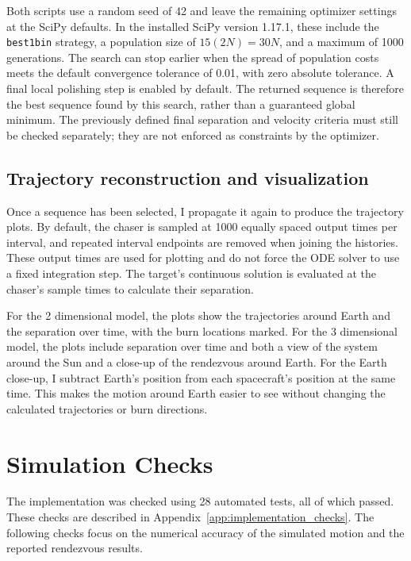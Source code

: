 \documentclass[11pt,letterpaper]{article}
\begin{document}
Both scripts use a random seed of 42 and leave the remaining optimizer
settings at the SciPy defaults. In the installed SciPy version 1.17.1,
these include the \texttt{best1bin} strategy, a population size of
$15(2N)=30N$, and a maximum of 1000 generations. The search can stop
earlier when the spread of population costs meets the default
convergence tolerance of 0.01, with zero absolute tolerance. A final
local polishing step is enabled by default. The returned sequence is
therefore the best sequence found by this search, rather than a
guaranteed global minimum. The previously defined final separation
and velocity criteria must still be checked separately; they are not
enforced as constraints by the optimizer.

\subsection{Trajectory reconstruction and visualization}
Once a sequence has been selected, I propagate it again to produce the
trajectory plots. By default, the chaser is sampled at 1000 equally
spaced output times per interval, and repeated interval endpoints are
removed when joining the histories. These output times are used for
plotting and do not force the ODE solver to use a fixed integration
step. The target's continuous solution is evaluated at the chaser's
sample times to calculate their separation.

For the 2 dimensional model, the plots show the trajectories around
Earth and the separation over time, with the burn locations marked.
For the 3 dimensional model, the plots include separation over time
and both a view of the system around the Sun and a close-up of the
rendezvous around Earth. For the Earth close-up, I subtract Earth's
position from each spacecraft's position at the same time. This makes
the motion around Earth easier to see without changing the calculated
trajectories or burn directions.

\section{Simulation Checks}
The implementation was checked using 28 automated tests, all of which
passed. These checks are described in Appendix~\ref{app:implementation_checks}.
The following checks focus on the numerical accuracy of the simulated
motion and the reported rendezvous results.
\end{document}
